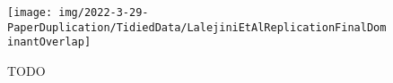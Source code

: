 \begin{figure}
    \centering
    \texttt{[image: img/2022-3-29-PaperDuplication/TidiedData/LalejiniEtAlReplicationFinalDominantOverlap]}
    \caption{TODO} \label{fig:LalejiniEtAlReplicationFinalDominantOverlap}
\end{figure}
